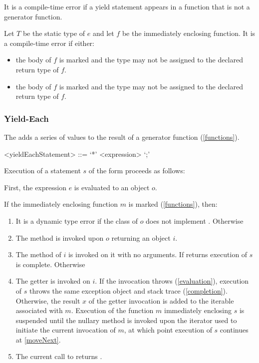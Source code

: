 \documentclass[makeidx]{article}
\begin{document}
{\LMHash{}%
It is a compile-time error if a yield statement appears in a function that is not a generator function.

\LMHash{}%
Let $T$ be the static type of $e$ and let $f$ be the immediately enclosing function.
It is a compile-time error if either:
\begin{itemize}
\item
the body of $f$ is marked \code{\ASYNC*} and the type  may not be assigned to the declared return type of $f$.
\item
the body of $f$ is marked \code{\SYNC*} and the type  may not be assigned to the declared return type of $f$.
\end{itemize}


\subsubsection{Yield-Each}

\LMHash{}%
The  adds a series of values to the result of a generator function (\ref{functions}).

\begin{grammar}
<yieldEachStatement> ::= \YIELD{} `*' <expression> `;'
\end{grammar}

\LMHash{}%
Execution of a statement $s$ of the form  proceeds as follows:

\LMHash{}%
First, the expression $e$ is evaluated to an object $o$.

\LMHash{}%
If the immediately enclosing function $m$ is marked \code{\SYNC*} (\ref{functions}), then:
\begin{enumerate}
\item It is a dynamic type error if the class of $o$ does not implement .
Otherwise
\item The method  is invoked upon $o$ returning an object $i$.
\item \label{moveNext} The  method of $i$ is invoked on it with no arguments.
If  returns \FALSE{} execution of $s$ is complete.
Otherwise
\item The getter  is invoked on $i$.
If the invocation throws (\ref{evaluation}), execution of $s$ throws the same exception object and stack trace (\ref{completion}).
Otherwise, the result $x$ of the getter invocation is added to the iterable associated with $m$.
Execution of the function $m$ immediately enclosing $s$ is suspended until the nullary method  is invoked upon the iterator used to initiate the current invocation of $m$, at which point execution of $s$ continues at \ref{moveNext}.
\item
The current call to  returns \TRUE.
\end{enumerate}

}
\end{document}
